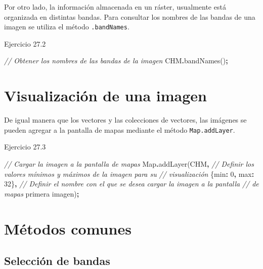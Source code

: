 \documentclass[
  12pt,
  letterpaper,
  twoside]{book}
\newenvironment{Shaded}{\begin{snugshade}}{\end{snugshade}}
\newcommand{\BuiltInTok}[1]{#1}
\newcommand{\CommentTok}[1]{\textcolor[rgb]{0.56,0.35,0.01}{\textit{#1}}}
\newcommand{\DataTypeTok}[1]{\textcolor[rgb]{0.13,0.29,0.53}{#1}}
\newcommand{\DecValTok}[1]{\textcolor[rgb]{0.00,0.00,0.81}{#1}}
\newcommand{\FunctionTok}[1]{\textcolor[rgb]{0.00,0.00,0.00}{#1}}
\newcommand{\NormalTok}[1]{#1}
\newcommand{\OperatorTok}[1]{\textcolor[rgb]{0.81,0.36,0.00}{\textbf{#1}}}
\newcommand{\StringTok}[1]{\textcolor[rgb]{0.31,0.60,0.02}{#1}}
\begin{document}
Por otro lado, la información almacenada en un ráster, usualmente está organizada en distintas bandas. Para consultar los nombres de las bandas de una imagen se utiliza el método \texttt{.bandNames}.

Ejercicio 27.2

\begin{Shaded}
\begin{Highlighting}[]
\CommentTok{// Obtener los nombres de las bandas de la imagen}
\NormalTok{CHM}\OperatorTok{.}\FunctionTok{bandNames}\NormalTok{()}\OperatorTok{;}
\end{Highlighting}
\end{Shaded}

\hypertarget{visualizaciuxf3n-de-una-imagen}{%
\section{Visualización de una imagen}\label{visualizaciuxf3n-de-una-imagen}}

De igual manera que los vectores y las colecciones de vectores, las imágenes se pueden agregar a la pantalla de mapas mediante el método \texttt{Map.addLayer}.

Ejercicio 27.3

\begin{Shaded}
\begin{Highlighting}[]
\CommentTok{// Cargar la imagen a la pantalla de mapas}
\BuiltInTok{Map}\OperatorTok{.}\FunctionTok{addLayer}\NormalTok{(CHM}\OperatorTok{,} 
  \CommentTok{// Definir los valores mínimos y máximos de la imagen para su }
  \CommentTok{// visualización}
\NormalTok{  \{}\DataTypeTok{min}\OperatorTok{:} \DecValTok{0}\OperatorTok{,} \DataTypeTok{max}\OperatorTok{:} \DecValTok{32}\NormalTok{\}}\OperatorTok{,} 
  \CommentTok{// Definir el nombre con el que se desea cargar la imagen a la pantalla }
  \CommentTok{// de mapas}
  \StringTok{\textquotesingle{}primera imagen\textquotesingle{}}\NormalTok{)}\OperatorTok{;}
\end{Highlighting}
\end{Shaded}

\hypertarget{muxe9todos-comunes-3}{%
\section{Métodos comunes}\label{muxe9todos-comunes-3}}

\hypertarget{selecciuxf3n-de-bandas}{%
\subsection{Selección de bandas}\label{selecciuxf3n-de-bandas}}
\end{document}

